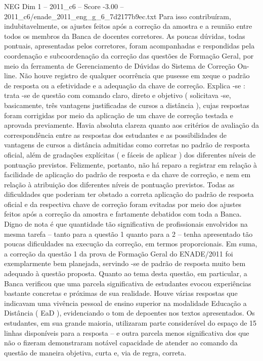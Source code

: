 \begin{textsample}{NEG Dim 1 – 2011\_c6 – Score -3.00 – 2011\_c6/enade\_2011\_eng\_g\_6\_7d2177b9ec.txt}
Para isso contribuíram, indubitavelmente, os ajustes feitos após a correção da amostra e a reunião entre todos os membros da Banca de docentes corretores.
As poucas dúvidas, todas pontuais, apresentadas pelos corretores, foram acompanhadas e respondidas pela coordenação e subcoordenação da correção das questões de Formação Geral, por meio da ferramenta de Gerenciamento de Dúvidas do Sistema de Correção On-line.
Não houve registro de qualquer ocorrência que pusesse em xeque o padrão de resposta ou a efetividade e a adequação da chave de correção.
Explica -se : trata -se de questão com comando claro, direto e objetivo ( solicitava -se, basicamente, três vantagens justificadas de cursos a distância ), cujas respostas foram corrigidas por meio da aplicação de um chave de correção testada e aprovada previamente.
Havia absoluta clareza quanto aos critérios de avaliação da correspondência entre as respostas dos estudantes e as possibilidades de vantagens de cursos a distância admitidas como corretas no padrão de resposta oficial, além de gradações explícitas ( e fáceis de aplicar ) dos diferentes níveis de pontuação previstos.
Felizmente, portanto, não há reparo a registrar em relação à facilidade de aplicação do padrão de resposta e da chave de correção, e nem em relação à atribuição dos diferentes níveis de pontuação previstos.
Todas as dificuldades que poderiam ter obstado a correta aplicação do padrão de resposta oficial e da respectiva chave de correção foram evitadas por meio dos ajustes feitos após a correção da amostra e fartamente debatidos com toda a Banca.
Digno de nota é que quantidade tão significativa de profissionais envolvidos na mesma tarefa – tanto para a questão 1 quanto para a 2 – tenha apresentado tão poucas dificuldades na execução da correção, em termos proporcionais.
Em suma, a correção da questão 1 da prova de Formação Geral do ENADE/2011 foi exemplarmente bem planejada, servindo -se de padrão de resposta muito bem adequado à questão proposta.
Quanto ao tema desta questão, em particular, a Banca verificou que uma parcela significativa de estudantes evocou experiências bastante concretas e próximas de sua realidade.
Houve várias respostas que indicavam uma vivência pessoal de ensino superior na modalidade Educação a Distância ( EaD ), evidenciando o tom de depoentes nos textos apresentados.
Os estudantes, em sua grande maioria, utilizaram parte considerável do espaço de 15 linhas disponíveis para a resposta – e outra parcela menos significativa dos que não o fizeram demonstraram notável capacidade de atender ao comando da questão de maneira objetiva, curta e, via de regra, correta.

\end{textsample}
